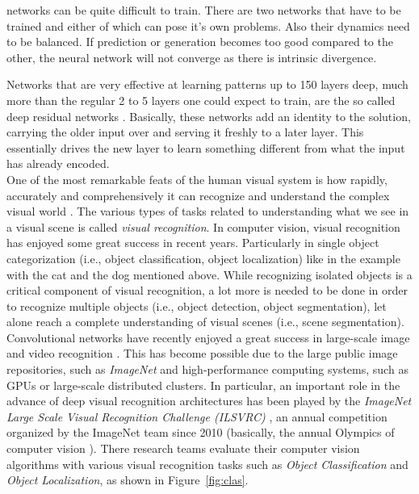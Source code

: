 \documentclass[12pt,a4paper]{report}
\newcommand{\term}{\textit}
\newcommand{\acronym}{\MakeUppercase}
\begin{document}
	networks can be quite difficult to train. There are two networks that have to be 
	trained and either of which can pose it’s own problems. Also their dynamics need 
	to be balanced. If prediction or generation becomes too good compared to the other, 
	the neural network will not converge as there is intrinsic divergence.
	\par
	Networks that are very effective at learning patterns up to 150 layers deep, much 
	more than the regular 2 to 5 layers one could expect to train, are the so called 
	deep residual networks \citep{He_resnet}. Basically, these networks add an identity 
	to the solution, carrying the older input over and serving it freshly to a later 
	layer. This essentially drives the new layer to learn something different from what 
	the input has already encoded. 
	\\
	
	One of the most remarkable feats of the human visual system is how rapidly, 
	accurately and comprehensively it can recognize and understand the complex visual 
	world \citep{Socher}. The various types of tasks related to understanding what 
	we see in a visual scene is called \term{visual recognition}. In computer vision, 
	visual recognition has enjoyed some great success in recent years. Particularly 
	in single object categorization (i.e., object classification, object localization) 
	like in the example with the cat and the dog mentioned above. 
	While recognizing isolated objects is a critical component of visual recognition, 
	a lot more is needed to be done in order to recognize multiple objects (i.e., 
	object detection, object segmentation), let alone reach a complete understanding 
	of visual scenes (i.e., scene segmentation).
	\\
	
	Convolutional networks have recently enjoyed a great success in large-scale image 
	and video recognition \citep{Simonyan_vgg}. This has become possible due to the large 
	public image repositories, such as \term{ImageNet} \citep{Deng} and high-performance 
	computing systems, such as \acronym{gpu}s or large-scale distributed clusters. In 
	particular, an important role in the advance of deep visual recognition architectures 
	has been played by the \term{ImageNet Large Scale Visual Recognition Challenge 
	(\acronym{ilsvrc})} \citep{Russakovsky}, an annual competition organized by the 
	ImageNet team since 2010 (basically, the annual Olympics of computer vision \citep{Deshpande}). 
	There research teams evaluate their computer vision algorithms with various visual 
	recognition tasks such as \term{Object Classification} and \term{Object Localization}, 
	as shown in Figure~\ref{fig:clas}.
	\\
	
\end{document}
